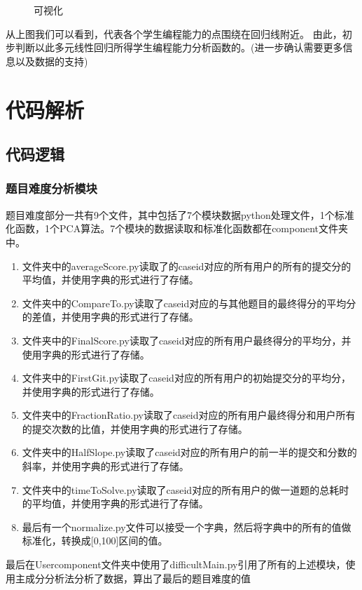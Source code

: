 \documentclass[UTF8]{ctexart}
\begin{document}
\begin{figure}[htb] 
\caption{\label{1} 可视化} 
\end{figure}

从上图我们可以看到，代表各个学生编程能力的点围绕在回归线附近。
由此，初步判断以此多元线性回归所得学生编程能力分析函数的。(进一步确认需要更多信息以及数据的支持)
\section{代码解析}
\subsection{代码逻辑}
\subsubsection{题目难度分析模块}
题目难度部分一共有9个文件，其中包括了7个模块数据python处理文件，1个标准化函数，1个PCA算法。7个模块的数据读取和标准化函数都在component文件夹中。

\begin{enumerate}

    \item 文件夹中的averageScore.py读取了的caseid对应的所有用户的所有的提交分的平均值，并使用字典的形式进行了存储。
    \item 文件夹中的CompareTo.py读取了caseid对应的与其他题目的最终得分的平均分的差值，并使用字典的形式进行了存储。
    \item 文件夹中的FinalScore.py读取了caseid对应的所有用户最终得分的平均分，并使用字典的形式进行了存储。
    \item 文件夹中的FirstGit.py读取了caseid对应的所有用户的初始提交分的平均分，并使用字典的形式进行了存储。
    \item 文件夹中的FractionRatio.py读取了caseid对应的所有用户最终得分和用户所有的提交次数的比值，并使用字典的形式进行了存储。
    \item 文件夹中的HalfSlope.py读取了caseid对应的所有用户的前一半的提交和分数的斜率，并使用字典的形式进行了存储。
    \item 文件夹中的timeToSolve.py读取了caseid对应的所有用户的做一道题的总耗时的平均值，并使用字典的形式进行了存储。
    \item 最后有一个normalize.py文件可以接受一个字典，然后将字典中的所有的值做标准化，转换成[0,100]区间的值。

\end{enumerate}
最后在Usercomponent文件夹中使用了difficultMain.py引用了所有的上述模块，使用主成分分析法分析了数据，算出了最后的题目难度的值
\end{document}
